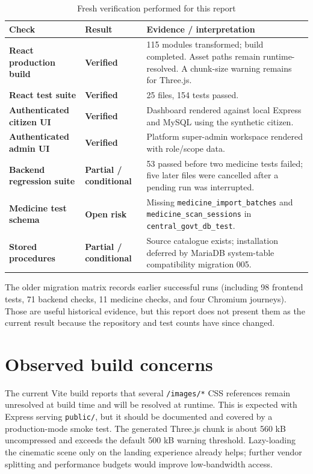 \documentclass[12pt,a4paper,oneside]{report}
\newcommand{\statusgood}{\textcolor{nationgreen}{\textbf{Verified}}}
\newcommand{\statuswarn}{\textcolor{riskamber}{\textbf{Partial / conditional}}}
\newcommand{\statusrisk}{\textcolor{riskred}{\textbf{Open risk}}}
\newcommand{\code}[1]{\texttt{#1}}
\begin{document}
\begin{table}[htbp]
\centering
\caption{Fresh verification performed for this report}
\begin{tabularx}{\textwidth}{>{\bfseries}p{} p{} X}
\toprule
Check & Result & Evidence / interpretation\\
\midrule
React production build & \statusgood & 115 modules transformed; build completed. Asset paths remain runtime-resolved. A chunk-size warning remains for Three.js.\\
React test suite & \statusgood & 25 files, 154 tests passed.\\
Authenticated citizen UI & \statusgood & Dashboard rendered against local Express and MySQL using the synthetic citizen.\\
Authenticated admin UI & \statusgood & Platform super-admin workspace rendered with role/scope data.\\
Backend regression suite & \statuswarn & 53 passed before two medicine tests failed; five later files were cancelled after a pending run was interrupted.\\
Medicine test schema & \statusrisk & Missing \code{medicine\_import\_batches} and \code{medicine\_scan\_sessions} in \code{central\_govt\_db\_test}.\\
Stored procedures & \statuswarn & Source catalogue exists; installation deferred by MariaDB system-table compatibility migration 005.\\
\bottomrule
\end{tabularx}
\end{table}

The older migration matrix records earlier successful runs (including 98 frontend tests, 71
backend checks, 11 medicine checks, and four Chromium journeys). Those are useful historical
evidence, but this report does not present them as the current result because the repository and
test counts have since changed.

\section{Observed build concerns}

The current Vite build reports that several \code{/images/*} CSS references remain unresolved at
build time and will be resolved at runtime. This is expected with Express serving \code{public/},
but it should be documented and covered by a production-mode smoke test. The generated Three.js
chunk is about 560 kB uncompressed and exceeds the default 500 kB warning threshold. Lazy-loading
the cinematic scene only on the landing experience already helps; further vendor splitting and
performance budgets would improve low-bandwidth access.
\end{document}
